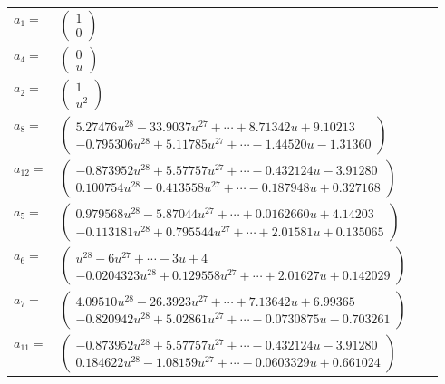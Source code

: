 \documentclass[1p]{elsarticle_modified}
\theoremstyle{definition}
\begin{document}
\begin{tabular}{m{7pt} m{180pt} m{7pt} m{180pt} }
\flushright $a_{1}=$&$\begin{pmatrix}1\\0\end{pmatrix}$ \\
\flushright $a_{4}=$&$\begin{pmatrix}0\\u\end{pmatrix}$ \\
\flushright $a_{2}=$&$\begin{pmatrix}1\\u^2\end{pmatrix}$ \\
\flushright $a_{8}=$&$\begin{pmatrix}5.27476 u^{28}-33.9037 u^{27}+\cdots+8.71342 u+9.10213\\-0.795306 u^{28}+5.11785 u^{27}+\cdots-1.44520 u-1.31360\end{pmatrix}$ \\
\flushright $a_{12}=$&$\begin{pmatrix}-0.873952 u^{28}+5.57757 u^{27}+\cdots-0.432124 u-3.91280\\0.100754 u^{28}-0.413558 u^{27}+\cdots-0.187948 u+0.327168\end{pmatrix}$ \\
\flushright $a_{5}=$&$\begin{pmatrix}0.979568 u^{28}-5.87044 u^{27}+\cdots+0.0162660 u+4.14203\\-0.113181 u^{28}+0.795544 u^{27}+\cdots+2.01581 u+0.135065\end{pmatrix}$ \\
\flushright $a_{6}=$&$\begin{pmatrix}u^{28}-6 u^{27}+\cdots-3 u+4\\-0.0204323 u^{28}+0.129558 u^{27}+\cdots+2.01627 u+0.142029\end{pmatrix}$ \\
\flushright $a_{7}=$&$\begin{pmatrix}4.09510 u^{28}-26.3923 u^{27}+\cdots+7.13642 u+6.99365\\-0.820942 u^{28}+5.02861 u^{27}+\cdots-0.0730875 u-0.703261\end{pmatrix}$ \\
\flushright $a_{11}=$&$\begin{pmatrix}-0.873952 u^{28}+5.57757 u^{27}+\cdots-0.432124 u-3.91280\\0.184622 u^{28}-1.08159 u^{27}+\cdots-0.0603329 u+0.661024\end{pmatrix}$ \\

\end{tabular}
\end{document}

